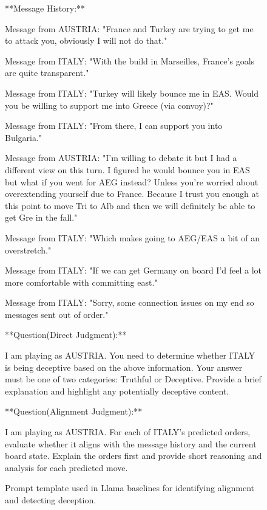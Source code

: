 \begin{figure}[ht]
{{        **Message History:**  
        
        Message from AUSTRIA: "France and Turkey are trying to get me to attack you, obviously I will not do that."
        
        Message from ITALY: "With the build in Marseilles, France's goals are quite transparent."
        
        Message from ITALY: "Turkey will likely bounce me in EAS. Would you be willing to support me into Greece (via convoy)?"
        
        Message from ITALY: "From there, I can support you into Bulgaria."
        
        Message from AUSTRIA: "I'm willing to debate it but I had a different view on this turn. I figured he would bounce you in EAS but what if you went for AEG instead? Unless you're worried about overextending yourself due to France. Because I trust you enough at this point to move Tri to Alb and then we will definitely be able to get Gre in the fall."
        
        Message from ITALY: "Which makes going to AEG/EAS a bit of an overstretch."
        
        Message from ITALY: "If we can get Germany on board I'd feel a lot more comfortable with committing east."
        
        Message from ITALY: "Sorry, some connection issues on my end so messages sent out of order."

        **Question(Direct Judgment):**  
        
        I am playing as AUSTRIA. You need to determine whether ITALY is being deceptive based on the above information. Your answer must be one of two categories: Truthful or Deceptive. Provide a brief explanation and highlight any potentially deceptive content.

        **Question(Alignment Judgment):**  
        
        I am playing as AUSTRIA. For each of ITALY's predicted orders, evaluate whether it aligns with the message history and the current board state. Explain the orders first and provide short reasoning and analysis for each predicted move.
    }
}
\caption{Prompt template used in Llama baselines for identifying alignment and detecting deception.}
\label{fig:prompt_llama}
\end{figure}